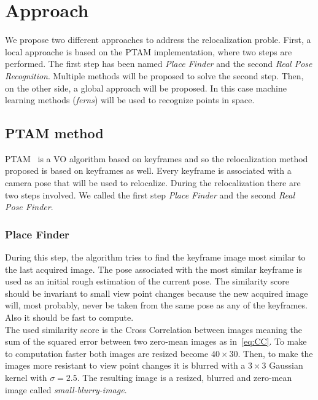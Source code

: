 
\section{Approach}\label{sec:approach}

We propose two different approaches to address the relocalization proble. First, a local approache is based on the PTAM implementation, where two steps are performed. The first step has been named \textit{Place Finder} and the second \textit{Real Pose Recognition}. Multiple methods will be proposed to solve the second step. Then, on the other side, a global approach will be proposed. In this case machine learning methods (\textit{ferns}) will be used to recognize points in space.

\subsection{PTAM method}
\label{sub:ptam_method}

PTAM~\cite{KleinMurray2007} is a VO algorithm based on keyframes and so the relocalization method proposed is based on keyframes as well. Every keyframe is associated with a camera pose that will be used to relocalize. During the relocalization there are two steps involved. We called the first step \textit{Place Finder} and the second \textit{Real Pose Finder}.

\subsubsection{Place Finder}
\label{ssub:place_recognition}

During this step, the algorithm tries to find the keyframe image most similar to the last acquired image. The pose associated with the most similar keyframe is used as an initial rough estimation of the current pose. The similarity score should be invariant to small view point changes because the new acquired image will, most probably, never be taken from the same pose as any of the keyframes. Also it should be fast to compute.\\

The used similarity score is the Cross Correlation between images meaning the sum of the squared error between two zero-mean images as in~\ref{eq:CC}. To make to computation faster both images are resized become $40\times30$. Then, to make the images more resistant to view point changes it is blurred with a $3\times3$ Gaussian kernel with $\sigma=2.5$. The resulting image is a resized, blurred and zero-mean image called \textit{small-blurry-image}.\\

